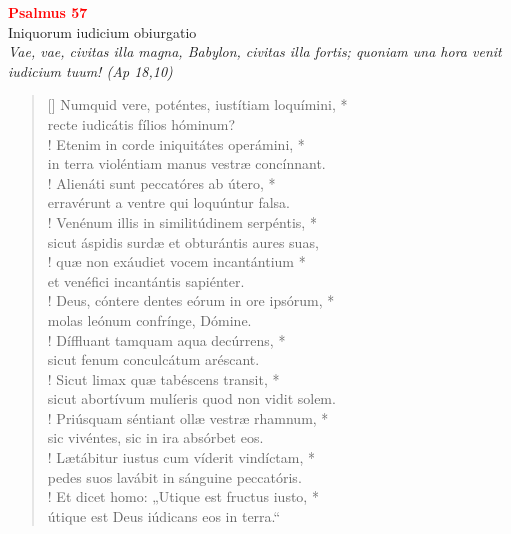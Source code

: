 


\def\greinitialformat#1{%
{\fontsize{39}{39}\selectfont #1}%
}




\vspace{0.3cm}
\begin{center}
 \textcolor{red}{\large \bf Psalmus 57}\\
Iniquorum iudicium obiurgatio\\
\textit{\small Vae, vae, civitas illa magna, Babylon, civitas illa fortis; quoniam una hora venit iudicium tuum! (Ap 18,10)}
\end{center}
\begin{verse}[\versewidth]
Numquid vere, poténtes, iustítiam loquímini, *\\
recte iudicátis fílios hóminum?\\!
\vin Etenim in corde iniquitátes operámini, *\\
\vin in terra violéntiam manus vestræ concínnant.\\!
Alienáti sunt peccatóres ab útero, *\\
erravérunt a ventre qui loquúntur falsa.\\!
\vin Venénum illis in similitúdinem serpéntis, *\\
\vin sicut áspidis surdæ et obturántis aures suas,\\!
quæ non exáudiet vocem incantántium *\\
et venéfici incantántis sapiénter.\\!
\vin Deus, cóntere dentes eórum in ore ipsórum, *\\
\vin molas leónum confrínge, Dómine.\\!
Díffluant tamquam aqua decúrrens, *\\
sicut fenum conculcátum aréscant.\\!
\vin Sicut limax quæ tabéscens transit, *\\
\vin sicut abortívum mulíeris quod non vidit solem.\\!
Priúsquam séntiant ollæ vestræ rhamnum, *\\
sic vivéntes, sic in ira absórbet eos.\\!
\vin Lætábitur iustus cum víderit vindíctam, *\\
\vin pedes suos lavábit in sánguine peccatóris.\\!
Et dicet homo: „Utique est fructus iusto, *\\
útique est Deus iúdicans eos in terra.“\\
\end{verse}
\vspace{1cm}



